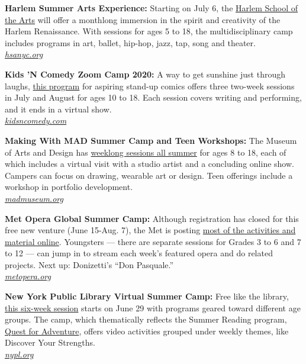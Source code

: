 \textbf{Harlem Summer Arts Experience:} Starting on July 6, the
\href{https://hsa.asapconnected.com/?org=4795\#ProgramID=5948}{Harlem
School of the Arts} will offer a monthlong immersion in the spirit and
creativity of the Harlem Renaissance. With sessions for ages 5 to 18,
the multidisciplinary camp includes programs in art, ballet, hip-hop,
jazz, tap, song and theater.\\
\href{https://hsanyc.org/}{\emph{hsanyc.org}}

\textbf{Kids 'N Comedy Zoom Camp 2020:} A way to get sunshine just
through laughs, \href{https://www.kidsncomedy.com/programs}{this
program} for aspiring stand-up comics offers three two-week sessions in
July and August for ages 10 to 18. Each session covers writing and
performing, and it ends in a virtual show.\\
\href{https://www.kidsncomedy.com/}{\emph{kidsncomedy.com}}

\textbf{Making With MAD Summer Camp and Teen Workshops:} The Museum of
Arts and Design has
\href{https://madmuseum.org/learn/summer-camp-and-teen-workshops}{weeklong
sessions all summer} for ages 8 to 18, each of which includes a virtual
visit with a studio artist and a concluding online show. Campers can
focus on drawing, wearable art or design. Teen offerings include a
workshop in portfolio development.\\
\href{https://madmuseum.org/}{\emph{madmuseum.org}}

\textbf{Met Opera Global Summer Camp:} Although registration has closed
for this free new venture (June 15-Aug. 7), the Met is posting
\href{https://www.metopera.org/discover/education/global-summer-camp/home/}{most
of the activities and material online}. Youngsters --- there are
separate sessions for Grades 3 to 6 and 7 to 12 --- can jump in to
stream each week's featured opera and do related projects. Next up:
Donizetti's ``Don Pasquale.''\\
\href{https://www.metopera.org/}{\emph{metopera.org}}

\textbf{New York Public Library Virtual Summer Camp:} Free like the
library, \href{https://www.nypl.org/125/summerreading/camp}{this
six-week session} starts on June 29 with programs geared toward
different age groups. The camp, which thematically reflects the Summer
Reading program, \href{https://www.nypl.org/125/summerreading}{Quest for
Adventure}, offers video activities grouped under weekly themes, like
Discover Your Strengths.\\
\href{https://www.nypl.org/}{\emph{nypl.org}}

